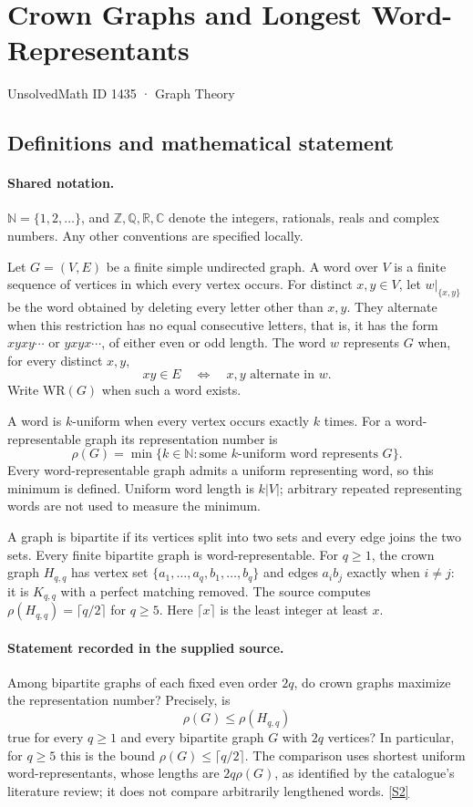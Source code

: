 \documentclass[11pt]{article}
\newcommand{\sref}[2]{\hyperlink{source:#1:#2}{[S#2]}}
\begin{document}
\setcounter{section}{1434}
\section{Crown Graphs and Longest Word-Representants}\label{1435}
{\small\sffamily UnsolvedMath ID 1435 · Graph Theory}
\subsection{Definitions and mathematical statement}

\paragraph{Shared notation.}$\mathbb N=\{1,2,\ldots\}$, and $\mathbb Z,\mathbb Q,\mathbb R,\mathbb C$ denote the integers, rationals, reals and complex numbers. Any other conventions are specified locally.


Let $G=(V,E)$ be a finite simple undirected graph. A word over $V$ is a finite sequence of vertices in which every vertex occurs. For distinct $x,y\in V$, let $w|_{\{x,y\}}$ be the word obtained by deleting every letter other than $x,y$. They alternate when this restriction has no equal consecutive letters, that is, it has the form $xyxy\cdots$ or $yxyx\cdots$, of either even or odd length. The word $w$ represents $G$ when, for every distinct $x,y$,
\[
 xy\in E\quad\Longleftrightarrow\quad x,y\text{ alternate in }w.
\]
Write $\mathrm{WR}(G)$ when such a word exists.

A word is $k$-uniform when every vertex occurs exactly $k$ times. For a word-representable graph its representation number is
\[
 \rho(G)=\min\{k\in\mathbb N:\text{some }k\text{-uniform word represents }G\}.
\]
Every word-representable graph admits a uniform representing word, so this minimum is defined. Uniform word length is $k|V|$; arbitrary repeated representing words are not used to measure the minimum.

A graph is bipartite if its vertices split into two sets and every edge joins the two sets. Every finite bipartite graph is word-representable. For $q\ge1$, the crown graph $H_{q,q}$ has vertex set $\{a_1,\ldots,a_q,b_1,\ldots,b_q\}$ and edges $a_ib_j$ exactly when $i\ne j$: it is $K_{q,q}$ with a perfect matching removed. The source computes $\rho(H_{q,q})=\lceil q/2\rceil$ for $q\ge5$. Here $\lceil x\rceil$ is the least integer at least $x$.
\paragraph{Statement recorded in the supplied source.}
Among bipartite graphs of each fixed even order $2q$, do crown graphs maximize the representation number? Precisely, is
\[
 \rho(G)\le\rho(H_{q,q})
\]
true for every $q\ge1$ and every bipartite graph $G$ with $2q$ vertices? In particular, for $q\ge5$ this is the bound $\rho(G)\le\lceil q/2\rceil$. The comparison uses shortest uniform word-representants, whose lengths are $2q\rho(G)$, as identified by the catalogue's literature review; it does not compare arbitrarily lengthened words. \sref{1435}{2}
\end{document}
